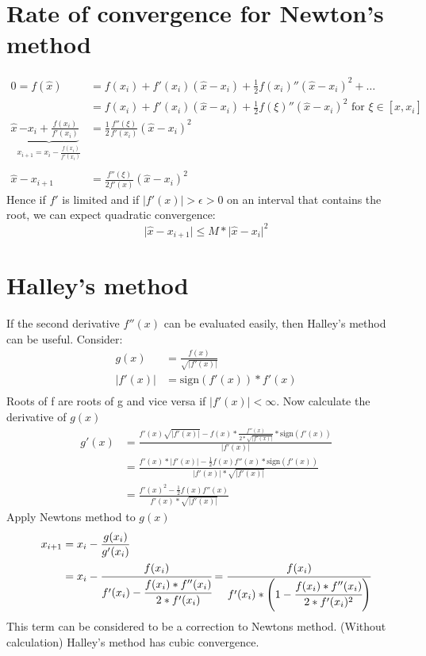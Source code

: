 \section{Rate of convergence for Newton's method}\label{sec:rate-of-convergence-for-newton's-method}
\begin{align*}
    0=f(\hat{x}) &= f(x_i) + f'(x_i)(\hat{x}-x_i)+\frac{1}{2}f(x_i)''(\hat{x}-x_i)^2+\ldots\\
    &=f(x_i)+f'(x_i)(\hat{x}-x_i)+\frac{1}{2}f(\xi)''(\hat{x}-x_i)^2 \text{ for }\xi \in [\hat{x}, x_i]\\
    \hat{x}\underbrace{-x_i+\frac{f(x_i)}{f'(x_i)}}_{x_{i+1}=x_i-\frac{f(x_i)}{f'(x_i)}} &= \frac{1}{2} \frac{f''(\xi)}{f'(x_i)}(\hat{x}-x_i)^2\\
    \\
    \hat{x}-x_{i+1}&=\frac{f''(\xi)}{2f'(x)}(\hat{x}-x_i)^2
\end{align*}
Hence if $f'$ is limited and if $\lvert f'(x) \rvert>\epsilon >0$ on an interval that contains the root,
we can expect quadratic convergence:
\begin{equation*}
    \lvert \hat{x}-x_{i+1} \rvert \leq M * \lvert \hat{x}-x_i \rvert^2
\end{equation*}


\section{Halley's method}\label{sec:halleys-method}
If the second derivative $f''(x)$ can be evaluated easily, then Halley's method can be useful.
Consider:
\begin{align*}
    g(x)&= \frac{f(x)}{\sqrt {\lvert f'(x) \rvert}}\\
    \lvert f'(x) \rvert &= \text{sign}(f'(x))*f'(x)\\
\end{align*}
Roots of f are roots of g and vice versa if $\lvert f'(x) \rvert < \infty$.
Now calculate the derivative of $g(x)$
\begin{align*}
    g'(x) &= \frac{f'(x) \sqrt{\lvert f'(x) \rvert}-f(x)*\frac{f''(x)}{2*\sqrt{\lvert f'(x) \rvert}}*\text{sign}(f'(x))}
    {\lvert f'(x) \rvert}\\
    &=\frac{f'(x)* \lvert f'(x) \rvert - \frac{1}{2} f(x)f''(x)*\text{sign}(f'(x))}{\lvert f'(x) \rvert * \sqrt {\lvert f'(x) \rvert}}\\
    &=\frac{f'(x)^2- \frac{1}{2}f(x)f''(x)}{f'(x)*\sqrt{\lvert f'(x) \rvert}}
\end{align*}
Apply Newtons method to $g(x)$
\begin{align*}
    x_{i+1} &= x_{i}- \frac{g(x_i)}{g'(x_i)}\\
    &=x_i-\cfrac{f(x_i)}{f'(x_i)-\cfrac{f(x_i)*f''(x_i)}{2*f'(x_i)}}=\cfrac{f(x_i)}{f'(x_i)*\left(1-\cfrac{f(x_i)*f''(x_i)}{2*f'(x_i)^2}\right)}
\end{align*}
This term can be considered to be a correction to Newtons method.
(Without calculation) Halley's method has cubic convergence.


